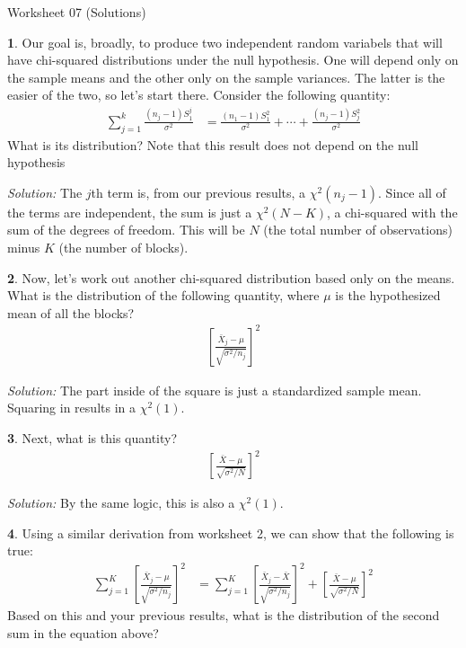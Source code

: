 \documentclass{tufte-handout}
\begin{document}
\justify

{\LARGE Worksheet 07 (Solutions)}

\vspace*{18pt}


\textbf{1}. Our goal is, broadly, to produce two independent random variabels that will have
chi-squared distributions under the null hypothesis. One will depend only on
the sample means and the other only on the sample variances. The latter is the
easier of the two, so let's start there. Consider the following quantity:
\begin{align*}
\sum_{j=1}^k \frac{(n_j - 1) S_1^j}{\sigma^2} &= \frac{(n_1 - 1) S_1^2}{\sigma^2} + \cdots + \frac{(n_j - 1) S_j^2}{\sigma^2}
\end{align*}
What is its distribution? Note that this result does not depend on the null
hypothesis

\textit{Solution:} The $j$th term is, from our previous results, a $\chi^2(n_j - 1)$. Since all
of the terms are independent, the sum is just a $\chi^2(N - K)$, a chi-squared
with the sum of the degrees of freedom. This will be $N$ (the total number of
observations) minus $K$ (the number of blocks).

\textbf{2}. Now, let's work out another chi-squared distribution based only on the means.
What is the distribution of the following quantity, where $\mu$ is the
hypothesized mean of all the blocks?
\begin{align*}
\left[\frac{\bar{X}_j - \mu}{\sqrt{\sigma^2 / n_j}}\right]^2
\end{align*} 

\textit{Solution:} The part inside of the square is just a standardized sample mean. Squaring
in results in a $\chi^2(1)$.

\textbf{3}. Next, what is this quantity?
\begin{align*}
\left[\frac{\bar{X} - \mu}{\sqrt{\sigma^2 / N}}\right]^2
\end{align*} 

\textit{Solution:} By the same logic, this is also a $\chi^2(1)$.

\textbf{4}. Using a similar derivation from worksheet 2, we can show that the following
is true:
\begin{align*}
\sum_{j=1}^K \left[\frac{\bar{X}_j - \mu}{\sqrt{\sigma^2 / n_j}}\right]^2 &=
\sum_{j=1}^K \left[\frac{\bar{X}_j - \bar{X}}{\sqrt{\sigma^2 / n_j}}\right]^2 +
\left[\frac{\bar{X} - \mu}{\sqrt{\sigma^2 / N}}\right]^2
\end{align*} 
Based on this and your previous results, what is the distribution of the 
second sum in the equation above?
\end{document}
